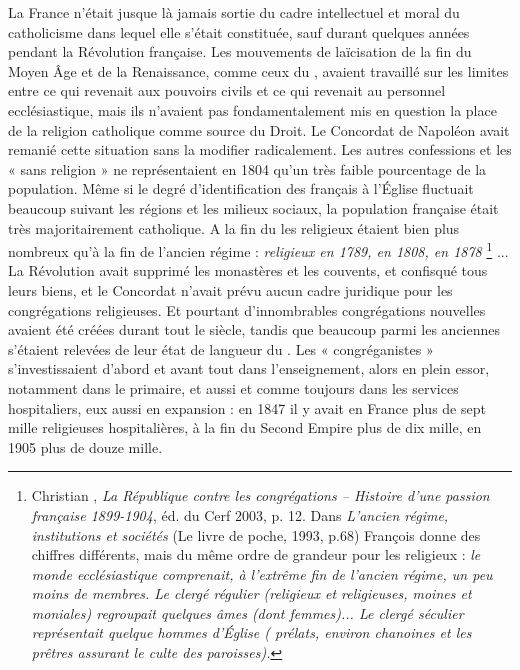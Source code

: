  La France n'était jusque là jamais sortie du cadre intellectuel et moral du catholicisme dans lequel elle s'était constituée, sauf durant quelques années pendant la Révolution française. Les mouvements de laïcisation de la fin du Moyen Âge et de la Renaissance, comme ceux du , avaient travaillé sur les limites entre ce qui revenait aux pouvoirs civils et ce qui revenait au personnel ecclésiastique, mais ils n'avaient pas fondamentalement mis en question la place de la religion catholique comme source du Droit. Le Concordat de \hbox{Napoléon} avait remanié cette situation sans la modifier radicalement. Les autres confessions et les « sans religion » ne représentaient en 1804 qu'un très faible pourcentage de la population. Même si le degré d'identification des français à l'Église fluctuait beaucoup suivant les régions et les milieux sociaux, la population française était très majoritairement catholique. A la fin du  les religieux étaient bien plus nombreux qu'à la fin de l'ancien régime : {\emph{ religieux en 1789,  en 1808,  en 1878}%
\footnote{Christian , \emph{La République contre les congrégations – Histoire d'une passion française 1899-1904}, éd. du Cerf 2003, p. 12. Dans \emph{L'ancien régime, institutions et sociétés} (Le livre de poche, 1993, p.68) François  donne des chiffres différents, mais du même ordre de grandeur pour les religieux : \emph{le monde ecclésiastique comprenait, à l'extrême fin de l'ancien régime, un peu moins de  membres. Le clergé régulier (religieux et religieuses, moines et moniales) regroupait quelques  âmes (dont  femmes)... Le clergé séculier représentait quelque  hommes d'Église ( prélats, environ  chanoines et les  prêtres assurant le culte des  paroisses).}}%
}... La Révolution avait supprimé les monastères et les couvents, et confisqué tous leurs biens, et le Concordat n'avait prévu aucun cadre juridique pour les congrégations religieuses. Et pourtant d'innombrables congrégations nouvelles avaient été créées durant tout le siècle, tandis que beaucoup parmi les anciennes s'étaient relevées de leur état de langueur du . Les « congréganistes » s'investissaient d'abord et avant tout dans l'enseignement, alors en plein essor, notamment dans le primaire, et aussi et comme toujours dans les services hospitaliers, eux aussi en expansion : en 1847 il y avait en France plus de sept mille religieuses hospitalières, à la fin du Second Empire plus de dix mille, en 1905 plus de douze mille.

